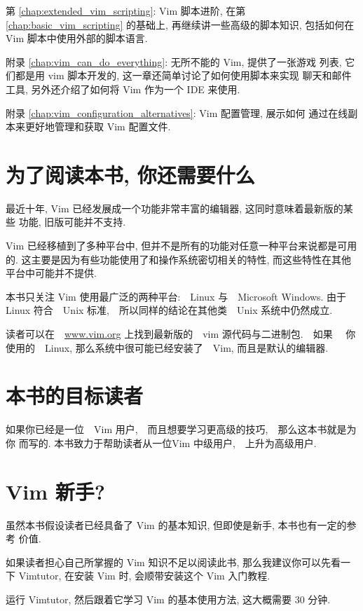 第 \ref{chap:extended_vim_scripting}: Vim 脚本进阶, 在第
\ref{chap:basic_vim_scripting} 的基础上, 再继续讲一些高级的脚本知识,
包括如何在 Vim 脚本中使用外部的脚本语言.

附录 \ref{chap:vim_can_do_everything}: 无所不能的 Vim, 提供了一张游戏
列表, 它们都是用 vim 脚本开发的, 这一章还简单讨论了如何使用脚本来实现
聊天和邮件工具, 另外还介绍了如何将 Vim 作为一个 IDE 来使用.

附录 \ref{chap:vim_configuration_alternatives}: Vim 配置管理, 展示如何
通过在线副本来更好地管理和获取 Vim 配置文件.

\section*{为了阅读本书, 你还需要什么}
最近十年, Vim 已经发展成一个功能非常丰富的编辑器, 这同时意味着最新版的某些
功能, 旧版可能并不支持.

Vim 已经移植到了多种平台中, 但并不是所有的功能对任意一种平台来说都是可用
的. 这主要是因为有些功能使用了和操作系统密切相关的特性, 而这些特性在其他
平台中可能并不提供.

本书只关注 Vim 使用最广泛的两种平台:　Linux 与　Microsoft Windows. 由于 Linux 
符合　Unix 标准,　所以同样的结论在其他类　Unix  系统中仍然成立.

\begin{warning}
读者可以在　\url{www.vim.org} 上找到最新版的　vim 源代码与二进制包.　如果　
你使用的　Linux, 那么系统中很可能已经安装了　Vim, 而且是默认的编辑器.
\end{warning}

\section*{本书的目标读者}
\label{sec:who_this_book_is_for}
如果你已经是一位　Vim 用户,　而且想要学习更高级的技巧,　那么这本书就是为你
而写的. 本书致力于帮助读者从一位Vim 中级用户,　上升为高级用户.

\section*{Vim 新手?}
\label{sec:new_to_vim}
虽然本书假设读者已经具备了 Vim 的基本知识, 但即使是新手, 本书也有一定的参考
价值.

如果读者担心自己所掌握的 Vim  知识不足以阅读此书, 那么我建议你可以先看一下
Vimtutor, 在安装 Vim 时, 会顺带安装这个 Vim 入门教程.

运行 Vimtutor, 然后跟着它学习 Vim 的基本使用方法, 这大概需要 30 分钟.

